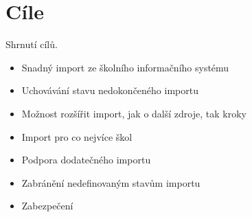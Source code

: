 \section{Cíle}
Shrnutí cílů.
\begin{itemize}
    \item Snadný import ze školního informačního systému
    \item Uchovávání stavu nedokončeného importu
    \item Možnost rozšířit import, jak o další zdroje, tak kroky
    \item Import pro co nejvíce škol
    \item Podpora dodatečného importu
    \item Zabránění nedefinovaným stavům importu
    \item Zabezpečení
\end{itemize}
